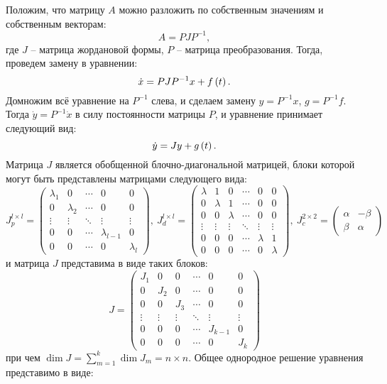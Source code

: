 	Положим, что матрицу $A$ можно разложить по собственным значениям и собственным векторам:
	\[ A = PJP^{-1}, \]
	где $J$ -- матрица жордановой формы, $P$ -- матрица преобразования. Тогда, проведем замену в уравнении:
	\[ \dot{x} = PJP^{-1} x + f\left( t \right). \]
	Домножим всё уравнение на $P^{-1}$ слева, и сделаем замену $y = P^{-1} x$, $g = P^{-1} f$. Тогда $\dot{y} = P^{-1} \dot{x}$ в силу постоянности матрицы $P$, и уравнение принимает следующий вид:
	\[ \dot{y} = J y + g\left( t \right). \]
	Матрица $J$ является обобщенной блочно-диагональной матрицей, блоки которой могут быть представлены матрицами следующего вида:
	\[ 
		J^{l \times l}_{p} = \begin{pmatrix} 
			\lambda_1 & 0 & \cdots & 0 & 0 \\ 
			0 & \lambda_2 & \cdots & 0 & 0 \\ 
			\vdots & \vdots & \ddots & \vdots & \vdots \\ 
			0 & 0 & \cdots & \lambda_{l-1} & 0 \\ 
			0 & 0 & \cdots & 0 & \lambda_l 
		\end{pmatrix}, ~ J^{l \times l}_{d} = \begin{pmatrix}
			\lambda & 1 & 0 & \cdots & 0 & 0 \\
			0 & \lambda & 1 & \cdots & 0 & 0 \\
			0 & 0 & \lambda & \cdots & 0 & 0 \\
			\vdots & \vdots & \vdots & \ddots & \vdots & \vdots \\
			0 & 0 & 0 & \cdots & \lambda & 1 \\
			0 & 0 & 0 & \cdots & 0 & \lambda
		\end{pmatrix}, ~ J^{2 \times 2}_{c} = \begin{pmatrix}
			\alpha & -\beta \\
			\beta & \alpha
		\end{pmatrix}
	\]
	и матрица $J$ представима в виде таких блоков:
	\[ J = \begin{pmatrix} 
		J_1 & 0 & 0 & \cdots & 0 & 0 \\ 
		0 & J_2 & 0 & \cdots & 0 & 0 \\ 
		0 & 0 & J_3 & \cdots & 0 & 0 \\ 
		\vdots & \vdots & \vdots & \ddots & \vdots & \vdots \\
		0 & 0 & 0 & \cdots & J_{k-1} & 0 \\ 
		0 & 0 & 0 & \cdots & 0 & J_{k} 
	\end{pmatrix} \]
	при чем $\dim{J} = \sum_{m = 1}^k \dim{J_m} = n \times n$. Общее однородное решение уравнения представимо в виде:
